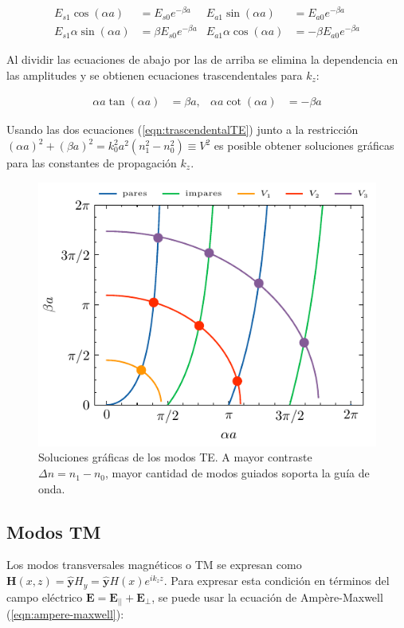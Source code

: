 \begin{align*}
E_{s1}\cos(\alpha a) &= E_{s0} e^{-\beta a} & E_{a1}\sin(\alpha a) &= E_{a0} e^{-\beta a}
\\
E_{s1}\alpha\sin(\alpha a) &= \beta E_{s0} e^{-\beta a} & E_{a1}\alpha\cos(\alpha a) &= -\beta E_{a0} e^{-\beta a}
\end{align*}

Al dividir las ecuaciones de abajo por las de arriba se elimina la dependencia en las amplitudes y se obtienen ecuaciones trascendentales para $k_z$:

\begin{align}
	\alpha a \tan(\alpha a) &= \beta a, & \alpha a \cot(\alpha a) &= -\beta a \label{eqn:trascendentalTE}
\end{align}

Usando las dos ecuaciones (\ref{eqn:trascendentalTE}) junto a la restricción $(\alpha a)^2 + (\beta a)^2 = k_0^2 a^2(n_1^2 - n_0^2) \equiv V^2$ es posible obtener soluciones gráficas para las constantes de propagación $k_z$.

\begin{figure}[H]
	\centering
	\includegraphics[width=0.7\linewidth]{media/slabgraphical}
	\caption[Soluciones gráficas de los modos TE]{Soluciones gráficas de los modos TE. A mayor contraste $\Delta n = n_1-n_0$, mayor cantidad de modos guiados soporta la guía de onda.}
\end{figure}
\subsection{Modos TM}
Los modos transversales magnéticos o TM se expresan como $\textbf{H}(x,z) =\mathbf{\hat{y}} H_y= \mathbf{\hat{y}} H(x)e^{i k_z z }$. Para expresar esta condición en términos del campo eléctrico $\textbf{E} = \textbf{E}_{||} + \textbf{E}_\perp$, se puede usar la ecuación de Ampère-Maxwell (\ref{eqn:ampere-maxwell}):


